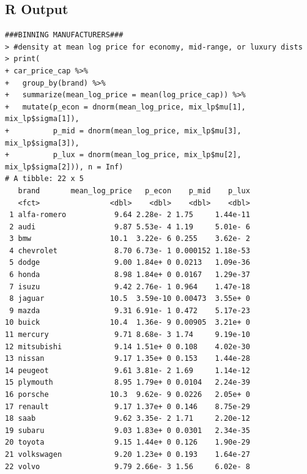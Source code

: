\documentclass[a4paper, 10pt, titlepage]{article}
\begin{document}
\subsection{R Output}
\begin{lstlisting}[basicstyle = \footnotesize \ttfamily]
###BINNING MANUFACTURERS###
> #density at mean log price for economy, mid-range, or luxury dists
> print(
+ car_price_cap %>%
+   group_by(brand) %>%
+   summarize(mean_log_price = mean(log_price_cap)) %>%
+   mutate(p_econ = dnorm(mean_log_price, mix_lp$mu[1], mix_lp$sigma[1]),
+          p_mid = dnorm(mean_log_price, mix_lp$mu[3], mix_lp$sigma[3]),
+          p_lux = dnorm(mean_log_price, mix_lp$mu[2], mix_lp$sigma[2])), n = Inf)
# A tibble: 22 x 5
   brand       mean_log_price   p_econ    p_mid    p_lux
   <fct>                <dbl>    <dbl>    <dbl>    <dbl>
 1 alfa-romero           9.64 2.28e- 2 1.75     1.44e-11
 2 audi                  9.87 5.53e- 4 1.19     5.01e- 6
 3 bmw                  10.1  3.22e- 6 0.255    3.62e- 2
 4 chevrolet             8.70 6.73e- 1 0.000152 1.18e-53
 5 dodge                 9.00 1.84e+ 0 0.0213   1.09e-36
 6 honda                 8.98 1.84e+ 0 0.0167   1.29e-37
 7 isuzu                 9.42 2.76e- 1 0.964    1.47e-18
 8 jaguar               10.5  3.59e-10 0.00473  3.55e+ 0
 9 mazda                 9.31 6.91e- 1 0.472    5.17e-23
10 buick                10.4  1.36e- 9 0.00905  3.21e+ 0
11 mercury               9.71 8.68e- 3 1.74     9.19e-10
12 mitsubishi            9.14 1.51e+ 0 0.108    4.02e-30
13 nissan                9.17 1.35e+ 0 0.153    1.44e-28
14 peugeot               9.61 3.81e- 2 1.69     1.14e-12
15 plymouth              8.95 1.79e+ 0 0.0104   2.24e-39
16 porsche              10.3  9.62e- 9 0.0226   2.05e+ 0
17 renault               9.17 1.37e+ 0 0.146    8.75e-29
18 saab                  9.62 3.35e- 2 1.71     2.20e-12
19 subaru                9.03 1.83e+ 0 0.0301   2.34e-35
20 toyota                9.15 1.44e+ 0 0.126    1.90e-29
21 volkswagen            9.20 1.23e+ 0 0.193    1.64e-27
22 volvo                 9.79 2.66e- 3 1.56     6.02e- 8


\end{lstlisting}
\end{document}
